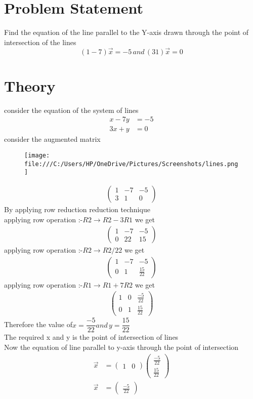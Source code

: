 \documentclass{article}
\newcommand{\myvec}[1]{\ensuremath{\begin{pmatrix}#1\end{pmatrix}}}
\begin{document}
\section{Problem Statement}
Find the equation of the line parallel to the Y-axis drawn through the point of intersection of the lines
\[
(1 -7)\vec{x}=-5 \, and \, (3 1)\vec{x}=0
\]
\section{Theory}
consider the equation of the system of lines
\begin{align}
x - 7y & = -5 \\
3x + y & = 0
\end{align}
 consider the augmented matrix
\begin{figure}
\texttt{[image: file:///C:/Users/HP/OneDrive/Pictures/Screenshots/lines.png]}
\end{figure}
 \begin{align}
 \myvec{1 & -7 & -5 \\ 3 & 1 & 0}
 \end{align}
 By applying row reduction reduction technique \\
 applying row operation :-$ R2 \xrightarrow{} R2-3R1$ we get \\
 \begin{align}
 \myvec{1 & -7 & -5 \\ 0 & 22 & 15}
  \end{align}
 applying row operation :-$ R2 \xrightarrow{} R2/22$ we get \\
  \begin{align}
 \myvec{1 & -7 & -5 \\ 0 & 1 & \frac{15}{22}}
 \end{align}
 applying row operation :-$ R1 \xrightarrow{} R1+7R2 $ we get \\
 \begin{align}
 \myvec{1 & 0 & \frac{-5}{22} \\ 0 & 1 & \frac{15}{22}}
 \end{align}
 Therefore the value of$ x = \dfrac{-5}{22} and\, y = \dfrac{15}{22}$ \\
 The required x and y is the point of intersection of lines\\ 
 Now the equation of line parallel to y-axis through the point of intersection\\
 \begin{align}
\vec{x} & = \myvec{1 & 0  }\myvec{ \frac{-5}{22}\\ \frac{15}{22}}\\
\vec{x} & = \myvec{\frac{-5}{22}}
 \end{align}

 
\end{document}
